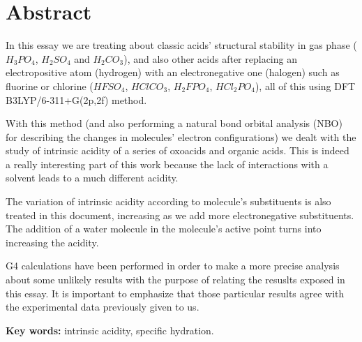 
\chapter*{Abstract} 

\begin{comment}
En este ensayo se trata la estabilidad estructural de ácidos clásicos en fase gas $H_3PO_4$, $H_2SO_4$ y $H_2CO_3$, y de ácidos cuando se sustituye un átomo electropositivo (hidrógeno) por uno electronegativo (halógeno) como el flúor y el cloro, $HFSO_4$, $HClCO_3$, $H_2FPO_4$, $HCl_2PO_4$ utilizando el método DFT B3LYP/6-311+G(2p,2f).

Con este método y haciendo un análisis de poblaciones NBO para describir los cambios en las configurciones electrónicas de las moléculas, se abordó también el estudio de la acidez intrínseca de una serie de oxácidos y ácidos orgánicos, siendo este apartado de gran interés, ya que la ausencia de interacciones con un disolvente resulta a una acidez muy diferente. 

La variación de acidez intrínseca según los sustituyentes de la molécula también se aborda en el presente proyecto, aumentando a medida que hay más sustituyentes electronegativos. La adición de una molécula de agua en el punto activo de la molécula se traduce en un aumento de su acidez.

Se han empleado cálculos G4 para hacer un análisis más preciso de algunos resultados dudosos con el fin de relacionar los resultados expuestos en el presente trabajo, es importante destacar que dichos resultados están de acuerdo con los datos experimentales previamente dados.
\end{comment}


In this essay we are treating about classic acids' structural stability in gas phase ($H_3PO_4$, $H_2SO_4$ and $H_2CO_3$), and also other acids after replacing an electropositive atom (hydrogen) with an electronegative one (halogen) such as fluorine or chlorine ($HFSO_4$, $HClCO_3$, $H_2FPO_4$, $HCl_2PO_4$), all of this using DFT B3LYP/6-311+G(2p,2f) method.

With this method (and also performing a natural bond orbital analysis (NBO) for describing the changes in molecules' electron configurations) we dealt with the study of intrinsic acidity of a series of oxoacids and organic acids. This is indeed a really interesting part of this work because the lack of interactions with a solvent leads to a much different acidity.

The variation of intrinsic acidity according to molecule's substituents is also treated in this document, increasing as we add more electronegative substituents.  The addition of a water molecule in the molecule's active point turns into increasing the acidity.

G4 calculations have been performed in order to make a more precise analysis about some unlikely results with the purpose of relating the resuslts exposed in this essay. It is important to emphasize that those particular results agree with the experimental data previously given to us.


\vspace{5mm}
\textbf{Key words:} intrinsic acidity, specific hydration.
